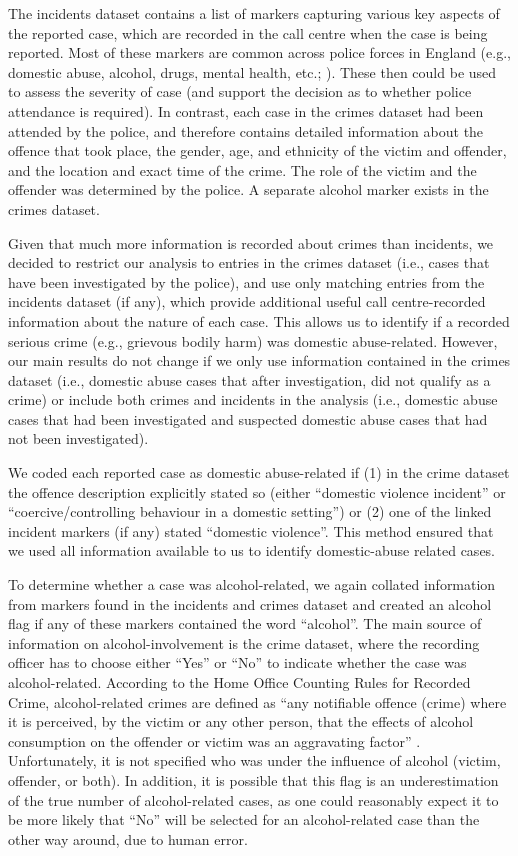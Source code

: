 \documentclass[12pt, a4paper]{article}
\begin{document}
The incidents dataset contains a list of markers capturing various key aspects of the reported case, which are recorded in the call centre when the case is being reported. Most of these markers are common across police forces in England (e.g., domestic abuse, alcohol, drugs, mental health, etc.; ). 
These then could be used to assess the severity of case (and support the decision as to whether police attendance is required). 
In contrast, each case in the crimes dataset had been attended by the police, and therefore contains detailed information about the offence that took place, the gender, age, and ethnicity of the victim and offender, and the location and exact time of the crime. 
The role of the victim and the offender was determined by the police. 
A separate alcohol marker exists in the crimes dataset.

Given that much more information is recorded about crimes than incidents, we decided to restrict our analysis to entries in the crimes dataset (i.e., cases that have been investigated by the police), and use only matching entries from the incidents dataset (if any), which provide additional useful call centre-recorded information about the nature of each case. 
This allows us to identify if a recorded serious crime (e.g., grievous bodily harm) was domestic abuse-related. 
However, our main results do not change if we only use information contained in the crimes dataset (i.e., domestic abuse cases that after investigation, did not qualify as a crime) or include both crimes and incidents in the analysis (i.e., domestic abuse cases that had been investigated and suspected domestic abuse cases that had not been investigated).   

We coded each reported case as domestic abuse-related if (1) in the crime dataset the offence description explicitly stated so (either ``domestic violence incident'' or ``coercive/controlling behaviour in a domestic setting'') or (2) one of the linked incident markers (if any) stated ``domestic violence''. This method ensured that we used all information available to us to identify domestic-abuse related cases. 

To determine whether a case was alcohol-related, we again collated information from markers found in the incidents and crimes dataset and created an alcohol flag if any of these markers contained the word ``alcohol''. The main source of information on alcohol-involvement is the crime dataset, where the recording officer has to choose either ``Yes'' or ``No'' to indicate whether the case was alcohol-related. According to the Home Office Counting Rules for Recorded Crime, alcohol-related crimes are defined as ``any notifiable offence (crime) where it is perceived, by the victim or any other person, that the
effects of alcohol consumption on the offender or victim was an aggravating factor'' \cite{Office2019}. Unfortunately, it is not specified who was under the influence of alcohol (victim, offender, or both). In addition, it is possible that this flag is an underestimation of the true number of alcohol-related cases, as one could reasonably expect it to be more likely that ``No'' will be selected for an alcohol-related case than the other way around, due to human error.
\end{document}
